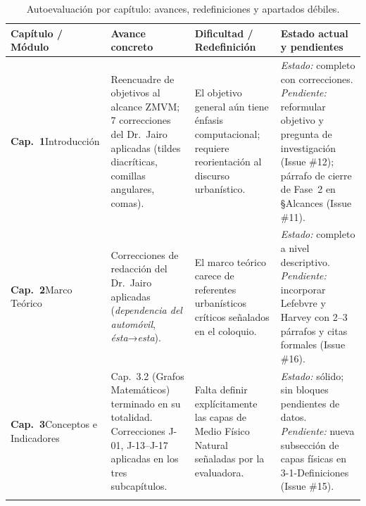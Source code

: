\begin{table}[H]
    \centering
    \caption{Autoevaluación por capítulo: avances, redefiniciones y apartados débiles.}
    \label{tab:autoevaluacion}
    \fontsize{9pt}{11.5pt}\selectfont
    \begin{tabularx}{\textwidth}{
        >{\hsize=0.55\hsize\raggedright\arraybackslash}X
        >{\hsize=1.15\hsize\raggedright\arraybackslash}X
        >{\hsize=1.15\hsize\raggedright\arraybackslash}X
        >{\hsize=1.15\hsize\raggedright\arraybackslash}X}
        \toprule
        \textbf{Capítulo / Módulo} &
        \textbf{Avance concreto} &
        \textbf{Dificultad / Redefinición} &
        \textbf{Estado actual y pendientes} \\
        \midrule

        \textbf{Cap.\ 1}\newline Introducción &
        Reencuadre de objetivos al alcance ZMVM; 7 correcciones del Dr.\ Jairo aplicadas (tildes diacríticas, comillas angulares, comas). &
        El objetivo general aún tiene énfasis computacional; requiere reorientación al discurso urbanístico. &
        \textit{Estado:} completo con correcciones.\newline
        \textit{Pendiente:} reformular objetivo y pregunta de investigación (Issue \#12); párrafo de cierre de Fase~2 en §Alcances (Issue \#11). \\
        \addlinespace\hline\addlinespace

        \textbf{Cap.\ 2}\newline Marco Teórico &
        Correcciones de redacción del Dr.\ Jairo aplicadas (\textit{dependencia del automóvil}, \textit{ésta}→\textit{esta}). &
        El marco teórico carece de referentes urbanísticos críticos señalados en el coloquio. &
        \textit{Estado:} completo a nivel descriptivo.\newline
        \textit{Pendiente:} incorporar Lefebvre y Harvey con 2--3 párrafos y citas formales (Issue \#16). \\
        \addlinespace\hline\addlinespace

        \textbf{Cap.\ 3}\newline Conceptos e Indicadores &
        Cap.\ 3.2 (Grafos Matemáticos) terminado en su totalidad. Correcciones J-01, J-13–J-17 aplicadas en los tres subcapítulos. &
        Falta definir explícitamente las capas de Medio Físico Natural señaladas por la evaluadora. &
        \textit{Estado:} sólido; sin bloques pendientes de datos.\newline
        \textit{Pendiente:} nueva subsección de capas físicas en 3-1-Definiciones (Issue \#15). \\
        \addlinespace\hline\addlinespace


\end{tabularx}
\end{table}
